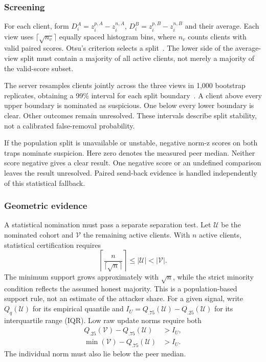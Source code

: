\documentclass[conference]{IEEEtran}
\begin{document}
\subsubsection{Screening}
For each client, form $D_i^A=z_i^{p,A}-z_i^{n,A}$,
$D_i^B=z_i^{p,B}-z_i^{n,B}$ and their average. Each view uses
$\lceil\sqrt{n_v}\rceil$ equally spaced histogram bins, where $n_v$ counts
clients with valid paired scores. Otsu's criterion selects a
split~\cite{otsu1979threshold}. The lower side of the average-view split
must contain a majority of all active clients, not merely a majority of
the valid-score subset.

The server resamples clients jointly across the three views in 1,000
bootstrap replicates, obtaining a 99\% interval for each split
boundary~\cite{efron1979bootstrap}. A client above every upper boundary
is nominated as suspicious. One below every lower boundary is clear.
Other outcomes remain unresolved. These intervals describe split
stability, not a calibrated false-removal probability.

If the population split is unavailable or unstable, negative norm-z scores
on both traps nominate suspicion. Here zero denotes the measured peer
median. Neither score negative gives a clear result. One negative score
or an undefined comparison leaves the result unresolved. Paired send-back evidence is handled
independently of this statistical fallback.

\subsubsection{Geometric evidence}
A statistical nomination must pass a separate separation test. Let
$\mathcal U$ be the nominated cohort and $\mathcal V$ the remaining active
clients. With $n$ active clients, statistical certification requires
\begin{equation}\label{eq:cohort-support}
 \left\lceil\frac{n}{\lceil\sqrt n\rceil}\right\rceil
       \leq|\mathcal U|<|\mathcal V|.
\end{equation}
The minimum support grows approximately with $\sqrt n$, while the strict
minority condition reflects the assumed honest majority. This is a
population-based support rule, not an estimate of the attacker share.
For a given signal, write $Q_q(\mathcal U)$ for its empirical quantile
and $I_U=Q_{.75}(\mathcal U)-Q_{.25}(\mathcal U)$ for its interquartile
range (IQR). Low raw update norms require both
\begin{align}\label{eq:norm-certificate}
 Q_{.25}(\mathcal V)-Q_{.75}(\mathcal U)&>I_U,\\
 \min(\mathcal V)-Q_{.75}(\mathcal U)&>I_U.\nonumber
\end{align}
The individual norm must also lie below the peer median.
\end{document}
